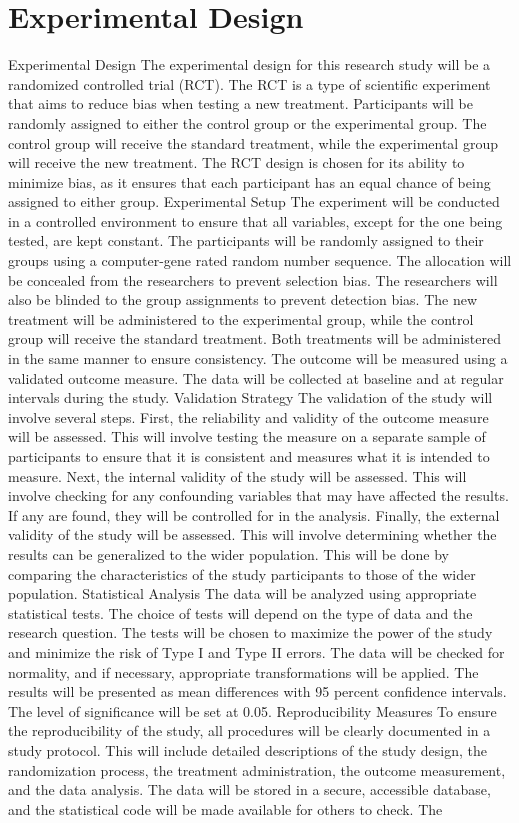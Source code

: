 \documentclass[conference]{IEEEtran}
\begin{document}
\section{Experimental Design}
Experimental Design The experimental design for this research study will be a randomized controlled trial (RCT). The RCT is a type of scientific experiment that aims to reduce bias when testing a new treatment. Participants will be randomly assigned to either the control group or the experimental group. The control group will receive the standard treatment, while the experimental group will receive the new treatment. The RCT design is chosen for its ability to minimize bias, as it ensures that each participant has an equal chance of being assigned to either group. Experimental Setup The experiment will be conducted in a controlled environment to ensure that all variables, except for the one being tested, are kept constant. The participants will be randomly assigned to their groups using a computer-gene rated random number sequence. The allocation will be concealed from the researchers to prevent selection bias. The researchers will also be blinded to the group assignments to prevent detection bias. The new treatment will be administered to the experimental group, while the control group will receive the standard treatment. Both treatments will be administered in the same manner to ensure consistency. The outcome will be measured using a validated outcome measure. The data will be collected at baseline and at regular intervals during the study. Validation Strategy The validation of the study will involve several steps. First, the reliability and validity of the outcome measure will be assessed. This will involve testing the measure on a separate sample of participants to ensure that it is consistent and measures what it is intended to measure. Next, the internal validity of the study will be assessed. This will involve checking for any confounding variables that may have affected the results. If any are found, they will be controlled for in the analysis. Finally, the external validity of the study will be assessed. This will involve determining whether the results can be generalized to the wider population. This will be done by comparing the characteristics of the study participants to those of the wider population. Statistical Analysis The data will be analyzed using appropriate statistical tests. The choice of tests will depend on the type of data and the research question. The tests will be chosen to maximize the power of the study and minimize the risk of Type I and Type II errors. The data will be checked for normality, and if necessary, appropriate transformations will be applied. The results will be presented as mean differences with 95 percent confidence intervals. The level of significance will be set at 0.05. Reproducibility Measures To ensure the reproducibility of the study, all procedures will be clearly documented in a study protocol. This will include detailed descriptions of the study design, the randomization process, the treatment administration, the outcome measurement, and the data analysis. The data will be stored in a secure, accessible database, and the statistical code will be made available for others to check. The 
\end{document}
